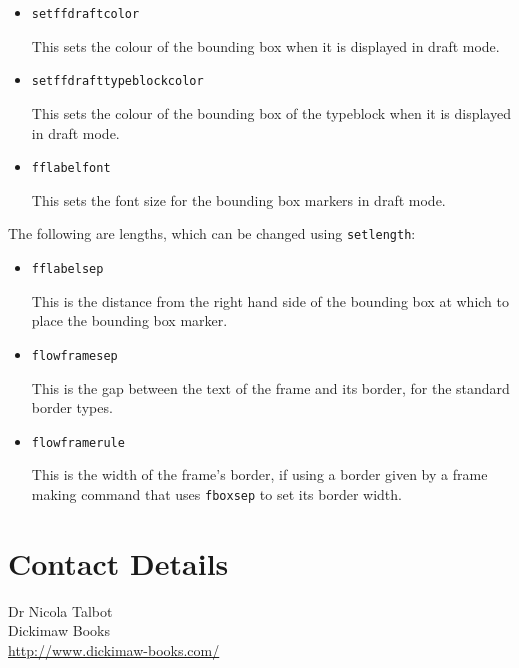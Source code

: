 \documentclass[a4paper]{article}
\newcommand{\cmdname}[1]{\texttt{\symbol{92}#1}}
\begin{document}
\begin{itemize}
\item \cmdname{setffdraftcolor}

This sets the colour of the bounding box
when it is displayed in draft mode.

\item
\cmdname{setffdrafttypeblockcolor}

This sets the colour of
the bounding box of the typeblock when it is displayed
in draft mode.

\item \cmdname{fflabelfont}

This sets the font size for the bounding box markers in
draft mode.

\end{itemize}

The following are lengths, which can be changed using
\cmdname{setlength}:

\begin{itemize}
\item \cmdname{fflabelsep}

This is the distance from the right hand side of the
bounding box at which to place the bounding box marker.

\item \cmdname{flowframesep}

This is the gap between the text of the frame and
its border, for the standard border types.

\item \cmdname{flowframerule}

This is the width of the frame's border, if using
a border given by a frame making command that uses \cmdname{fboxsep}
to set its border width.
\end{itemize}

\section*{Contact Details}

Dr Nicola Talbot\\
Dickimaw Books\\
\url{http://www.dickimaw-books.com/}
\end{document}
